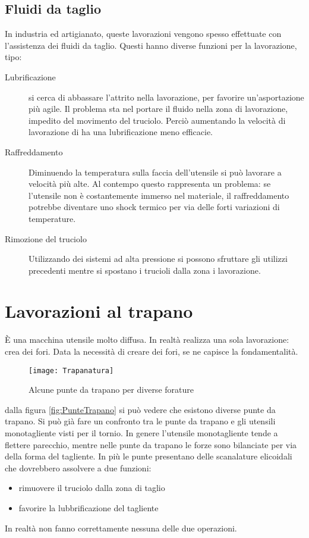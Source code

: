 \subsection{Fluidi da taglio}
In industria ed artigianato, queste lavorazioni vengono spesso
effettuate con l'assistenza dei fluidi da taglio.
Questi hanno diverse funzioni per la lavorazione, tipo:

\begin{description}
\item[Lubrificazione] si cerca di abbassare l'attrito nella
lavorazione, per favorire un'asportazione più agile.
Il problema sta nel portare il fluido nella zona di lavorazione,
impedito del movimento del truciolo.
Perciò aumentando la velocità di lavorazione di ha una 
lubrificazione meno efficacie.
\item[Raffreddamento] Diminuendo la temperatura sulla faccia 
dell'utensile si può lavorare a velocità più alte.
Al contempo questo rappresenta un problema: se l'utensile non è 
costantemente immerso nel materiale, il raffreddamento potrebbe
diventare uno shock termico per via delle forti variazioni di 
temperature.
\item[Rimozione del truciolo] Utilizzando dei sistemi ad alta
pressione si possono sfruttare gli utilizzi precedenti mentre 
si spostano i trucioli dalla zona i lavorazione.
\end{description}

\newpage
\section{Lavorazioni al trapano}
È una macchina utensile molto diffusa.
In realtà realizza una sola lavorazione: crea dei fori.
Data la necessità di creare dei fori, se ne capisce la fondamentalità.

\begin{figure}
\centering
\texttt{[image: Trapanatura]}
\caption{Alcune punte da trapano per diverse forature}
\label{fig:Tapanatura}
\end{figure}

dalla figura \ref{fig:PunteTrapano} si può vedere che esistono diverse punte da trapano.
Si può già fare un confronto tra le punte da trapano e gli utensili
monotagliente visti per il tornio.
In genere l'utensile monotagliente tende a flettere parecchio, mentre nelle punte da trapano 
le forze sono bilanciate per via della forma del tagliente.
In più le punte presentano delle scanalature elicoidali che dovrebbero assolvere
a due funzioni:
\begin{itemize}
\item rimuovere il truciolo dalla zona di taglio
\item favorire la lubbrificazione del tagliente
\end{itemize}
In realtà non fanno correttamente nessuna delle due operazioni.

